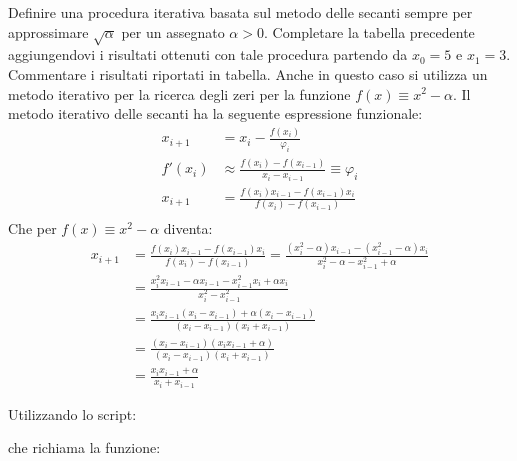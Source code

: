 Definire una procedura iterativa basata sul metodo delle secanti sempre per approssimare $\sqrt{\alpha}$ per un assegnato $\alpha > 0$. Completare la tabella
precedente aggiungendovi i risultati ottenuti con tale procedura partendo da $x_0 = 5$ e $x_1=3$. Commentare i risultati riportati in tabella.
\PP
Anche in questo caso si utilizza un metodo iterativo per la ricerca degli zeri per la funzione $f(x) \equiv x^2 - \alpha$. Il metodo iterativo delle secanti ha la seguente espressione funzionale:
\begin{equation*}
	\begin{split}
		x_{i+1} & = x_i-\frac{f(x_i)}{\varphi_i} \\
		f'(x_i) & \approx \frac{f(x_i) - f(x_{i-1})}{x_i - x_{i-1}} \equiv \varphi_i \\
		x_{i+1} & = \frac{f(x_i)x_{i-1}-f(x_{i-1})x_i}{f(x_i)-f(x_{i-1})} \\
	\end{split}
\end{equation*}
Che per $f(x) \equiv x^2 - \alpha$ diventa:
\begin{equation*}
	\begin{split}
		x_{i+1} & = \frac{f(x_i)x_{i-1}-f(x_{i-1})x_i}{f(x_i)-f(x_{i-1})} = \frac{(x_i^2-\alpha)x_{i-1}-(x^2_{i-1}-\alpha)x_i}{x_i^2-\alpha - x_{i-1}^2 + \alpha}\\
		& = \frac{ x_i^2x_{i-1} - \alpha x_{i-1} - x^2_{i-1}x_i + \alpha x_i }{ x_i^2 - x_{i-1}^2 } \\
		& = \frac{ x_i x_{i-1} ( x_i - x_{i-1} ) + \alpha ( x_i - x_{i-1} ) }{ ( x_i - x_{i-1} ) ( x_i + x_{i-1} ) } \\
		& = \frac{ ( x_i - x_{i-1} ) (x_i x_{i-1}  + \alpha) }{ ( x_i - x_{i-1} ) ( x_i + x_{i-1} ) } \\ 
		& = \frac{ x_i x_{i-1}  + \alpha }{ x_i + x_{i-1} }
	\end{split}
\end{equation*}

Utilizzando lo script:


che richiama la funzione:


